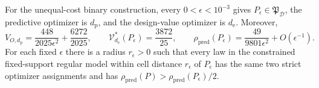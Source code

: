 For the unequal-cost binary construction, every \(0<\epsilon<10^{-3}\) gives \(P_{\epsilon}\in\mathfrak P_{\mathcal D}\), the predictive optimizer is \(d_{\mathrm p}\), and the design-value optimizer is \(d_{\mathrm e}\).  Moreover,
\[
 V_{O,d_{\mathrm p}}=\frac{448}{2025\epsilon^2}+\frac{6272}{2025},\qquad
 \mathcal V_{d_{\mathrm e}}^*(P_{\epsilon})=\frac{3872}{25},\qquad
 \rho_{\mathrm{pred}}(P_{\epsilon})=\frac{49}{9801\epsilon^2}+O(\epsilon^{-1}).
\]
For each fixed \(\epsilon\) there is a radius \(r_\epsilon>0\) such that every law in the constrained fixed-support regular model within cell distance \(r_\epsilon\) of \(P_\epsilon\) has the same two strict optimizer assignments and has \(\rho_{\mathrm{pred}}(P)>\rho_{\mathrm{pred}}(P_\epsilon)/2\).